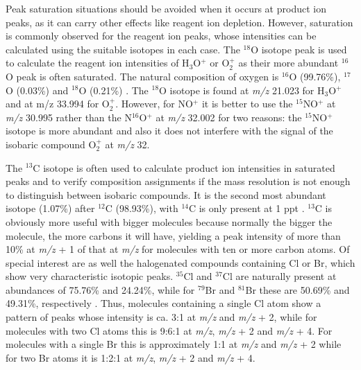 
Peak saturation situations should be avoided when it occurs at product ion peaks, as it can carry other effects like reagent ion depletion.
However, saturation is commonly observed for the reagent ion peaks, whose intensities can be calculated using the suitable isotopes in each case.
The $^{18}$O isotope peak is used to calculate the reagent ion intensities of  H$_3$O$^+$ or O$_2^+$ as their more abundant $^{16}$O peak is often saturated.
The natural composition of oxygen is $^{16}$O (99.76\%), $^{17}$O (0.03\%) and $^{18}$O (0.21\%) \cite{nistoxygen}.
The $^{18}$O isotope is found at \textit{m/z} 21.023 for H$_3$O$^+$ and at m/z 33.994 for O$_2^+$.
However, for NO$^+$ it is better to use the $^{15}$NO$^+$ at \textit{m/z} 30.995 rather than the N$^{16}$O$^+$ at \textit{m/z}  32.002 for two reasons: the $^{15}$NO$^+$  isotope  is more abundant  and also it does not interfere with the  signal of the isobaric compound O$_2^+$  at \textit{m/z}  32.

The $^{13}$C isotope is often used to calculate product ion intensities in saturated peaks and to verify composition assignments if the mass resolution is not enough to distinguish between isobaric compounds.
It is the second most abundant isotope (1.07\%) after  $^{12}$C (98.93\%), with  $^{14}$C is only present at 1 ppt \cite{nistcarbon}.
$^{13}$C is obviously more useful with bigger molecules because normally the bigger the molecule, the more carbons it will have, yielding a peak intensity of more than 10\% at %
\textit{m/z} + 1 of that at \textit{m/z} for molecules with ten or more carbon atoms.
Of special interest are as well the halogenated compounds containing Cl or Br, which show  very characteristic isotopic  peaks. $^{35}$Cl and $^{37}$Cl are naturally present at abundances of 75.76\% and 24.24\%, while for $^{79}$Br and $^{81}$Br these are 50.69\% and 49.31\%, respectively \cite{nistcl,nistbr}.
Thus,  molecules containing a single Cl atom show a pattern of peaks whose intensity is ca. 3:1 at  \textit{m/z} and %
\textit{m/z} + 2, while for molecules with two Cl atoms this is 9:6:1 at  \textit{m/z}, %
\textit{m/z} + 2 and %
\textit{m/z} + 4. 
For  molecules with a single Br this is approximately 1:1 at  \textit{m/z} and %
\textit{m/z} + 2 while for two Br atoms it is 1:2:1 at \textit{m/z}, %
\textit{m/z} + 2 and %
\textit{m/z} + 4.

